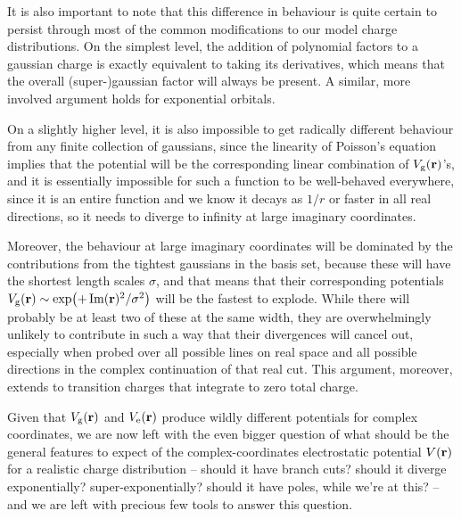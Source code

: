 It is also important to note that this difference in behaviour is quite certain to persist through most of the common modifications to our model charge distributions. On the simplest level, the addition of polynomial factors to a gaussian charge is exactly equivalent to taking its derivatives, which means that the overall (super-)gaussian factor will always be present. A similar, more involved argument holds for exponential orbitals.

On a slightly higher level, it is also impossible to get radically different behaviour from any finite collection of gaussians, since the linearity of Poisson's equation implies that the potential will be the corresponding linear combination of $V_\mathrm{g}(\vb{r})$'s, and it is essentially impossible for such a function to be well-behaved everywhere, since it is an entire function and we know it decays as $1/r$ or faster in all real directions, so it needs to diverge to infinity at large imaginary coordinates. 

Moreover, the behaviour at large imaginary coordinates will be dominated by the contributions from the tightest gaussians in the basis set, because these will have the shortest length scales $\sigma$, and that means that their corresponding potentials $V_\mathrm{g}(\vb{r})\sim \exp(+\Im(\vb{r})^2/\sigma^2)$ will be the fastest to explode. While there will probably be at least two of these at the same width, they are overwhelmingly unlikely to contribute in such a way that their divergences will cancel out, especially when probed over all possible lines on real space and all possible directions in the complex continuation of that real cut.  This argument, moreover, extends to transition charges that integrate to zero total charge.



Given that $V_\mathrm{g}(\vb{r})$ and $V_\mathrm{e}(\vb{r})$ produce wildly different potentials for complex coordinates, we are now left with the even bigger question of what should be the general features to expect of the complex-coordinates electrostatic potential $V(\vb{r})$ for a realistic charge distribution -- should it have branch cuts? should it diverge exponentially? super-exponentially? should it have poles, while we're at this? -- and we are left with precious few tools to answer this question.



